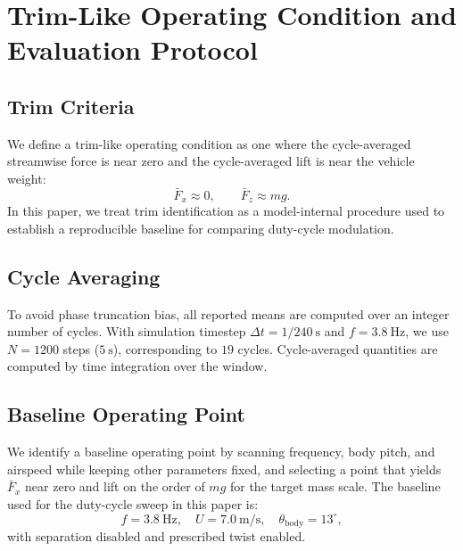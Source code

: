 \section{Trim-Like Operating Condition and Evaluation Protocol}
\subsection{Trim Criteria}
We define a trim-like operating condition as one where the cycle-averaged streamwise force is near zero and the cycle-averaged lift is near the vehicle weight:
\begin{equation}
\bar{F}_x \approx 0,\qquad \bar{F}_z \approx mg.
\end{equation}
In this paper, we treat trim identification as a model-internal procedure used to establish a reproducible baseline for comparing duty-cycle modulation.

\subsection{Cycle Averaging}
To avoid phase truncation bias, all reported means are computed over an integer number of cycles.
With simulation timestep $\Delta t = 1/240~\mathrm{s}$ and $f=3.8~\mathrm{Hz}$, we use $N=1200$ steps ($5~\mathrm{s}$), corresponding to $19$ cycles.
Cycle-averaged quantities are computed by time integration over the window.

\subsection{Baseline Operating Point}
We identify a baseline operating point by scanning frequency, body pitch, and airspeed while keeping other parameters fixed, and selecting a point that yields $\bar{F}_x$ near zero and lift on the order of $mg$ for the target mass scale.
The baseline used for the duty-cycle sweep in this paper is:
\begin{equation}
f = 3.8~\mathrm{Hz},\quad U = 7.0~\mathrm{m/s},\quad \theta_{\mathrm{body}} = 13^\circ,
\end{equation}
with separation disabled and prescribed twist enabled.
